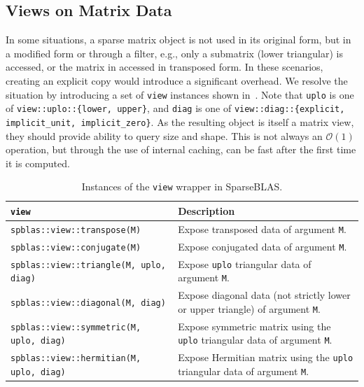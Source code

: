 \documentclass[manuscript,review]{acmart}
\begin{document}
\noindent


\subsection{Views on Matrix Data}
\label{sec:views}
In some situations, a sparse matrix object is not used in its original form, but in a modified form or through a filter, e.g., only a submatrix (lower triangular) is accessed, or the matrix in accessed in transposed form. In these scenarios, creating an explicit copy would introduce a significant overhead. We resolve the situation by introducing a set of \texttt{view} instances shown in~. Note that \verb|uplo| is one of \texttt{view::uplo::\{lower, upper\}}, and \texttt{diag} is one of \texttt{view::diag::\{explicit, implicit\_unit, implicit\_zero\}}.  As the resulting object is itself a matrix view, they should provide ability to query size and shape.  This is not always an
$\mathcal{O}(1)$ operation, but through the use of internal caching, can
be fast after the first time it is computed.

\begin{table}[htbp]
  \centering
  \caption{Instances of the \texttt{view} wrapper in SparseBLAS.} 
  \label{tab:views}
  \begin{tabularx}{\linewidth}{l X}
    \toprule
    \textbf{\texttt{view}} & \textbf{Description} \\
    \midrule
    \texttt{spblas::view::transpose(M)}           & Expose transposed data of argument \texttt{M}. \\
    \texttt{spblas::view::conjugate(M)}           & Expose conjugated data of argument \texttt{M}. \\
    \texttt{spblas::view::triangle(M, uplo, diag)}  & Expose \texttt{uplo} triangular data of argument \texttt{M}. \\
    \texttt{spblas::view::diagonal(M, diag)}      & Expose diagonal data (not strictly lower or upper triangle) of argument \texttt{M}. \\
    \texttt{spblas::view::symmetric(M, uplo, diag)} & Expose symmetric matrix using the \texttt{uplo} triangular data of argument \texttt{M}. \\
    \texttt{spblas::view::hermitian(M, uplo, diag)} & Expose Hermitian matrix using the \texttt{uplo} triangular data of argument \texttt{M}. \\
    \bottomrule
  \end{tabularx}
\end{table}
\end{document}
